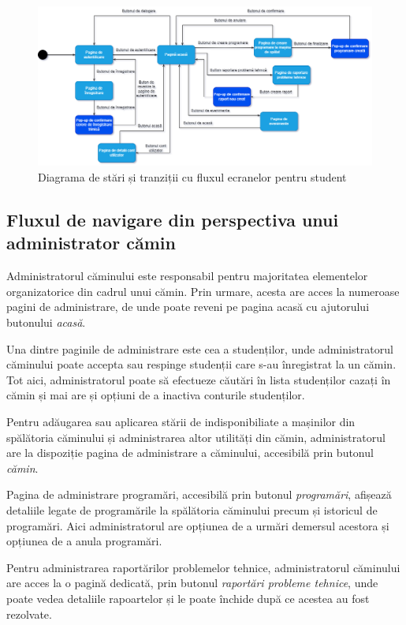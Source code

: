 \documentclass[12pt,a4paper]{report}
\theoremstyle{definition}
\theoremstyle{remark}
\begin{document}
\begin{figure}[H]
    \centering
    \includegraphics[width=0.75\linewidth]{resurse/diagrame/diagrama_de_navigare1.1.drawio.png}
    \caption{Diagrama de stări și tranziții cu fluxul ecranelor pentru student}
\end{figure}

\subsection{Fluxul de navigare din perspectiva unui administrator cămin}
\par Administratorul căminului este responsabil pentru majoritatea elementelor organizatorice din cadrul unui cămin. Prin urmare, acesta are acces la numeroase pagini de administrare, de unde poate reveni pe pagina acasă cu ajutorului butonului \textit{acasă}.

\par Una dintre paginile de administrare este cea a studenților, unde administratorul căminului poate accepta sau respinge studenții care s-au înregistrat la un cămin. Tot aici, administratorul poate să efectueze căutări în lista studenților cazați în cămin și mai are și opțiuni de a inactiva conturile studenților.

\par Pentru adăugarea sau aplicarea stării de indisponibiliate a mașinilor din spălătoria căminului și administrarea altor utilități din cămin, administratorul are la dispoziție pagina de administrare a căminului, accesibilă prin butonul \textit{cămin}.

\par Pagina de administrare programări, accesibilă prin butonul \textit{programări}, afișează detaliile legate de programările la spălătoria căminului precum și istoricul de programări. Aici administratorul are opțiunea de a urmări demersul acestora și opțiunea de a anula programări.

\par Pentru administrarea raportărilor problemelor tehnice, administratorul căminului are acces la o pagină dedicată, prin butonul \textit{raportări probleme tehnice}, unde poate vedea detaliile rapoartelor și le poate închide după ce acestea au fost rezolvate.
\end{document}
